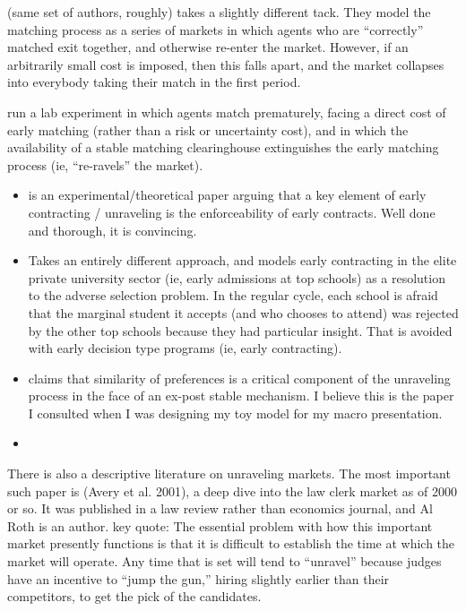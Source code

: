 \documentclass[AER]{AEA}
\begin{document}
\cite{Damiano2005} (same set of authors, roughly) takes a slightly different tack.  They model the matching process as a series of markets in which agents who are “correctly” matched exit together, and otherwise re-enter the market.  However, if an arbitrarily small cost is imposed, then this falls apart, and the market collapses into everybody taking their match in the first period. 

\cite{Damiano2005} run a lab experiment in which agents match prematurely, facing a direct cost of early matching (rather than a risk or uncertainty cost), and in which the availability of a stable matching clearinghouse extinguishes the early matching process (ie, “re-ravels” the market).
\begin{itemize}
	\item \cite{Niederle2004} is an experimental/theoretical paper arguing that a key element of early contracting / unraveling is the enforceability of early contracts.  Well done and thorough, it is convincing.
	\item   \cite{Lee2009}Takes an entirely different approach, and models early contracting in the elite private university sector (ie, early admissions at top schools) as a resolution to the adverse selection problem.  In the regular cycle, each school is afraid that the marginal student it accepts (and who chooses to attend) was rejected by the other top schools because they had particular insight.  That is avoided with early decision type programs (ie, early contracting).
	\item  \cite{Halaburda2010} claims that similarity of preferences is a critical component of the unraveling process in the face of an ex-post stable mechanism.  I believe this is the paper I consulted when I was designing my toy model for my macro presentation.  
	\item 
\end{itemize}




There is also a descriptive literature on unraveling markets.  The most important such paper is (Avery et al. 2001), a deep dive into the law clerk market as of 2000 or so.  It was published in a law review rather than economics journal, and Al Roth is an author. key quote:
The essential problem with how this important market presently functions is that it is difficult to establish the time at which the market will operate. Any time that is set will tend to “unravel” because judges have an incentive to “jump the gun,” hiring slightly earlier than their competitors, to get the pick of the candidates.
\end{document}

